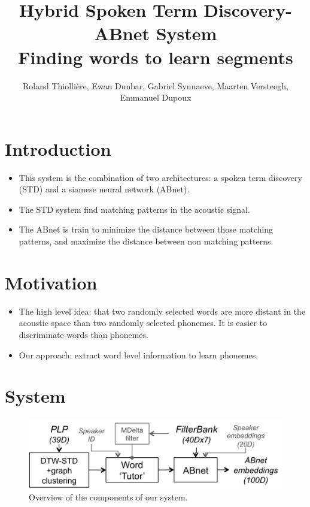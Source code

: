 \documentclass[final]{beamer}
\title
[Interspeech (2015, Dresden, Germany)] %
{ %
Hybrid Spoken Term Discovery-ABnet System\\
Finding words to learn segments
}
\author{ %
Roland Thiolli\`ere\inst{*}, Ewan Dunbar\inst{*}, Gabriel Synnaeve\inst{*\dagger}, Maarten Versteegh\inst{*}, Emmanuel Dupoux\inst{*}
}
\institute
[ENS] %
{
\inst{*} LSCP, \'{E}cole Normale Sup\'{e}rieure / EHESS / CNRS, Paris, France\\%
\inst{\dagger} now at Facebook AI Research\\[0.5ex]
\inst{} \begin{small}\texttt{rolthiolliere@gmail.com, emd@umd.edu, gabrielsynnaeve@gmail.com, maartenversteegh@gmail.com, emmanuel.dupoux@gmail.com}\end{small}
}
\newcommand{\abnet}{{\sc ABnet}}
\begin{document}
\begin{frame}[t]
\begin{multicols}{3} %

\section{Introduction}

\begin{itemize}
\item This system is the combination of two architectures: a spoken term discovery\cite{jansenvandurme2011} (STD) and a siamese neural network\cite{synnaevedupoux2014} (\abnet{}).
\item The STD system find matching patterns in the acoustic signal.
\item The \abnet{} is train to minimize the distance between those matching patterns, and maximize the distance between non matching patterns.
\end{itemize}



\section{Motivation}

\begin{itemize}
\item The high level idea: that two randomly selected words are more distant in the acoustic space than two randomly selected phonemes. It is easier to discriminate words than phonemes.
\item Our approach: extract word level information to learn phonemes.
\end{itemize}


\section{System}

\begin{figure}[ht!]
  \begin{center}
    \includegraphics[width=0.85\columnwidth]{System2.png}
    \caption{\label{fig:system}Overview of the components of our system.}
  \end{center}
\end{figure}


\end{multicols}
\end{frame}
\end{document}
